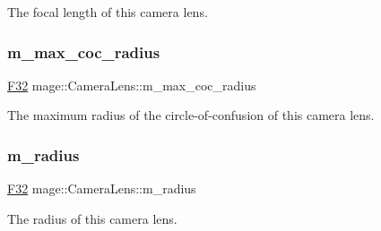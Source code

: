 The focal length of this camera lens. \hypertarget{classmage_1_1_camera_lens_aec350fe54ff0b7a2c32466b4d59e225b}{}\label{classmage_1_1_camera_lens_aec350fe54ff0b7a2c32466b4d59e225b} 
\subsubsection{\texorpdfstring{m\+\_\+max\+\_\+coc\+\_\+radius}{m\_max\_coc\_radius}}
{\footnotesize\ttfamily \hyperlink{namespacemage_aa97e833b45f06d60a0a9c4fc22ae02c0}{F32} mage\+::\+Camera\+Lens\+::m\+\_\+max\+\_\+coc\+\_\+radius\hspace{0.3cm}{\ttfamily [private]}}

The maximum radius of the circle-\/of-\/confusion of this camera lens. \hypertarget{classmage_1_1_camera_lens_ad32c883707e4571d307221a308bb1e36}{}\label{classmage_1_1_camera_lens_ad32c883707e4571d307221a308bb1e36} 
\subsubsection{\texorpdfstring{m\+\_\+radius}{m\_radius}}
{\footnotesize\ttfamily \hyperlink{namespacemage_aa97e833b45f06d60a0a9c4fc22ae02c0}{F32} mage\+::\+Camera\+Lens\+::m\+\_\+radius\hspace{0.3cm}{\ttfamily [private]}}

The radius of this camera lens. 